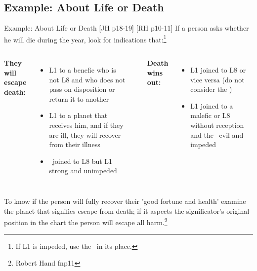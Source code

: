 \subsection{Example: About Life or Death}
\begin{frame}[t]{Example: About Life or Death [JH p18-19] [RH p10-11]}
If a person asks whether he will die during the year, look for indications that:\footnote{If L1 is impeded, use the \Moon\ in its place.}
\vspace{0.5cm}
\begin{columns}[T, onlytextwidth]
\textbf{They will escape death:}\\
\begin{itemize}
\item L1 to a benefic who is not L8 and who does not pass on disposition or return it to another 
\vspace{0.25cm}

\item L1 to a planet that receives him, and if they are ill, they will recover from their illness
\vspace{0.25cm}

\item \Moon\ joined to L8 but L1 strong and unimpeded
\end{itemize}

\rule{.1mm}{.35\textheight}

\textbf{Death wins out:}\\
\begin{itemize}
\item L1 joined to L8 or vice versa (do not consider the \Moon) 
\vspace{0.25cm}

\item L1 joined to a malefic or L8 without reception and the \Moon\ evil and impeded
\end{itemize}
\end{columns}
\vspace{0.5cm}
To know if the person will fully recover their  'good fortune and health' examine the planet that signifies escape from death; if it aspects the significator's original position in the chart the person will escape all harm.\footnote{Robert Hand fnp11}
\end{frame}